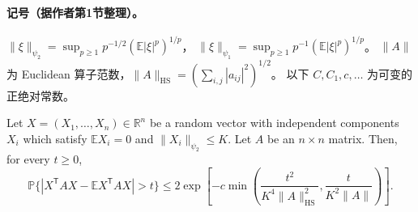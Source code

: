 
\paragraph{记号（据作者第1节整理）。}
$\|\xi\|_{\psi_2}=\sup_{p\geq1}p^{-1/2}(\mathbb E|\xi|^p)^{1/p}$，
$\|\xi\|_{\psi_1}=\sup_{p\geq1}p^{-1}(\mathbb E|\xi|^p)^{1/p}$。
$\|A\|$ 为 Euclidean 算子范数，$\|A\|_{\mathrm{HS}}=(\sum_{i,j}|a_{ij}|^2)^{1/2}$。
以下 $C,C_1,c,\ldots$ 为可变的正绝对常数。
\begin{theorem}
Let $X=(X_1,\ldots,X_n)\in\mathbb R^n$ be a random vector with independent
components $X_i$ which satisfy $\mathbb E X_i=0$ and $\|X_i\|_{\psi_2}\leq K$.
Let $A$ be an $n\times n$ matrix. Then, for every $t\geq0$,
\[
\mathbb P\{|X^{\mathsf T}AX-\mathbb E X^{\mathsf T}AX|>t\}
\leq2\exp\left[-c\min\left(\frac{t^2}{K^4\|A\|_{\mathrm{HS}}^2},
\frac{t}{K^2\|A\|}\right)\right].
\]
\end{theorem}
